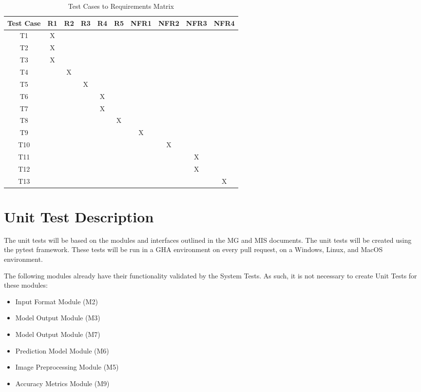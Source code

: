 \documentclass[12pt, titlepage]{article}
\begin{document}
\begin{table}[h]
\centering
\begin{tabular}{|c|c|c|c|c|c|c|c|c|c|}
\hline
\textbf{Test Case} & \textbf{R1} & \textbf{R2} & \textbf{R3} & \textbf{R4} & \textbf{R5} & \textbf{NFR1} & \textbf{NFR2} & \textbf{NFR3} & \textbf{NFR4} \\ \hline
T1 & X &   &   &   &   &   &   &   &   \\ \hline
T2 & X &   &   &   &   &   &   &   &   \\ \hline
T3 & X &   &   &   &   &   &   &   &   \\ \hline
T4 &   & X &   &   &   &   &   &   &   \\ \hline
T5 &   &   & X &   &   &   &   &   &   \\ \hline
T6 &   &   &   & X &   &   &   &   &   \\ \hline
T7 &   &   &   & X &   &   &   &   &   \\ \hline
T8 &   &   &   &   & X &   &   &   &   \\ \hline
T9 &   &   &   &   &   & X &   &   &   \\ \hline
T10 &  &   &   &   &   &   & X &   &   \\ \hline
T11 &  &   &   &   &   &   &   & X &   \\ \hline
T12 &  &   &   &   &   &   &   & X &   \\ \hline
T13 &  &   &   &   &   &   &   &   & X \\ \hline
\end{tabular}
\caption{Test Cases to Requirements Matrix}
\label{tab:test-requirements-matrix}
\end{table}

\section{Unit Test Description}

The unit tests will be based on the modules and interfaces outlined in the
MG \citep{MG} and MIS \citep{MIS} documents. The unit tests will be created using
the pytest framework. These tests will be run in a GHA environment on every pull
request, on a Windows, Linux, and MacOS environment.

The following modules already have their functionality validated by the System Tests. As such, it is not necessary to create Unit Tests for these modules:

\begin{itemize}
  \item Input Format Module (M2)
  \item Model Output Module (M3)
  \item Model Output Module (M7)
  \item Prediction Model Module (M6)
  \item Image Preprocessing Module (M5)
  \item Accuracy Metrics Module (M9)
\end{itemize}
\end{document}
